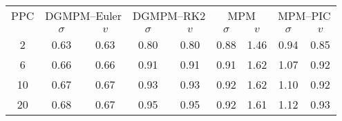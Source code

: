   \begin{tabular}{c|cc|cc|cc|cc}
    \hline
    PPC & \multicolumn{2}{c}{DGMPM--Euler}  \vline & \multicolumn{2}{c}{DGMPM--RK2}\vline  & \multicolumn{2}{c}{MPM} \vline & \multicolumn{2}{c}{MPM--PIC}  \\ [6pt]
    & $\sigma$ & $v$  & $\sigma$ & $v$  & $\sigma$ & $v$ & $\sigma$ & $v$\\ 
    \hline
    \hline
    2 & 0.63 & 0.63 & 0.80 &0.80 & 0.88 & 1.46&0.94& 0.85\\
    6 & 0.66 & 0.66 & 0.91 &0.91 &  0.91&1.62&1.07&0.92\\
    10 & 0.67 & 0.67 & 0.93 &0.93 &0.92&1.62&1.10&0.92\\
    20 & 0.68 & 0.67 & 0.95 &0.95 &0.92&1.61&1.12&0.93\\
    \hline
  \end{tabular}

